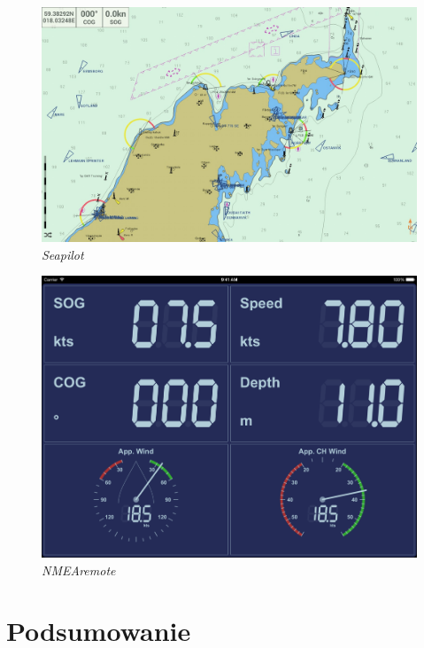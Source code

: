 \documentclass[skorowidz,skroty]{dyplomWEZUT}
\begin{document}
\begin{figure}[H]
  \centering
    \includegraphics[scale=0.3]{graphic/Seapilot}
    \caption{\textit{Seapilot}}
    \label{fig:Seapilot}
\end{figure}

\begin{figure}[H]
  \centering
    \includegraphics[scale=0.3]{graphic/NMEAremote}
    \caption{\textit{NMEAremote}}
    \label{fig:NMEAremote}
\end{figure}

\section{Podsumowanie}\label{chap: summary}
\end{document}
